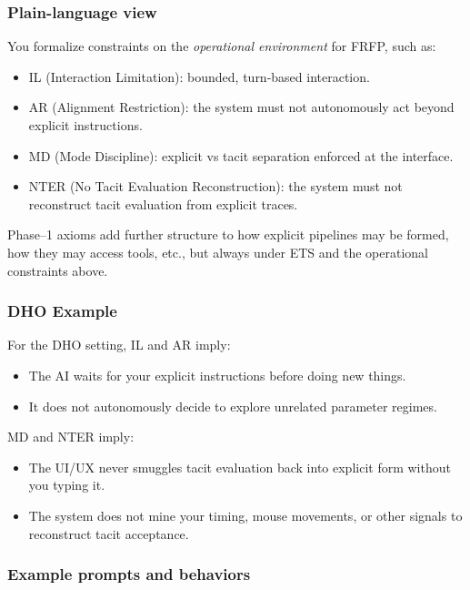 \subsubsection*{Plain-language view}

You formalize constraints on the \emph{operational environment} for FRFP, such as:

\begin{itemize}
 \item IL (Interaction Limitation): bounded, turn-based interaction.
 \item AR (Alignment Restriction): the system must not autonomously act beyond explicit instructions.
 \item MD (Mode Discipline): explicit vs tacit separation enforced at the interface.
 \item NTER (No Tacit Evaluation Reconstruction): the system must not reconstruct tacit evaluation 
 from explicit traces.
\end{itemize}

Phase--1 axioms add further structure to how explicit pipelines may be formed, how they may access
tools, etc., but always under ETS and the operational constraints above.

\subsubsection*{DHO Example}

For the DHO setting, IL and AR imply:

\begin{itemize}
 \item The AI waits for your explicit instructions before doing new things.
 \item It does not autonomously decide to explore unrelated parameter regimes.
\end{itemize}

MD and NTER imply:

\begin{itemize}
 \item The UI/UX never smuggles tacit evaluation back into explicit form without you typing it.
 \item The system does not mine your timing, mouse movements, or other signals to reconstruct tacit
 acceptance.
\end{itemize}

\subsubsection*{Example prompts and behaviors}

